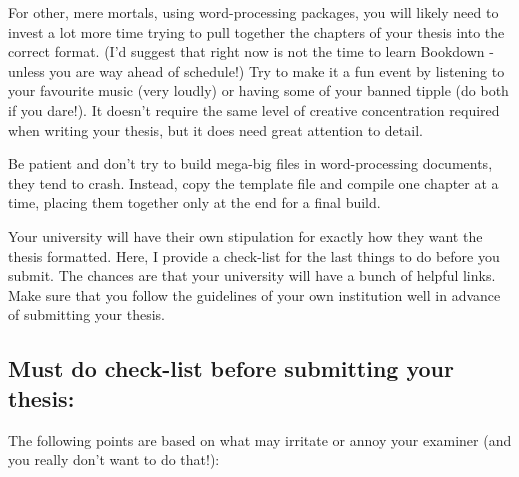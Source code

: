\documentclass[
]{krantz}
\begin{document}
For other, mere mortals, using word-processing packages, you will likely need to invest a lot more time trying to pull together the chapters of your thesis into the correct format. (I'd suggest that right now is not the time to learn Bookdown - unless you are way ahead of schedule!) Try to make it a fun event by listening to your favourite music (very loudly) or having some of your banned tipple (do both if you dare!). It doesn't require the same level of creative concentration required when writing your thesis, but it does need great attention to detail.

Be patient and don't try to build mega-big files in word-processing documents, they tend to crash. Instead, copy the template file and compile one chapter at a time, placing them together only at the end for a final build.

Your university will have their own stipulation for exactly how they want the thesis formatted. Here, I provide a check-list for the last things to do before you submit. The chances are that your university will have a bunch of helpful links. Make sure that you follow the guidelines of your own institution well in advance of submitting your thesis.

\hypertarget{must-do-check-list-before-submitting-your-thesis}{%
\subsection{Must do check-list before submitting your thesis:}\label{must-do-check-list-before-submitting-your-thesis}}

The following points are based on what may irritate or annoy your examiner (and you really don't want to do that!):
\end{document}
